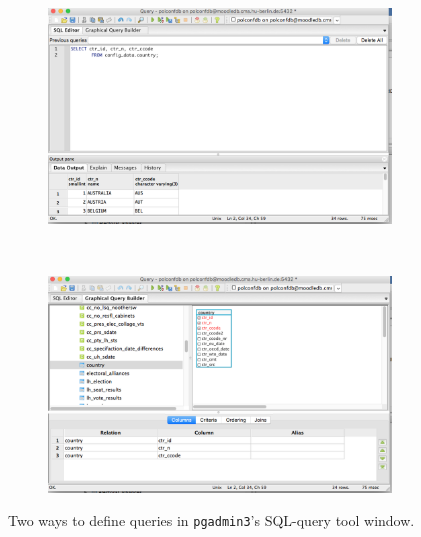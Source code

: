\begin{figure}[ht!]
\centering
  \begin{subfigure}{.45\textwidth}
  \includegraphics[width=\textwidth,trim= 0 0 0 0, clip]{pcdb_documentation_screenshots/pgadmin3_sql_query_tool_editor_country.png}
    \label{fig_pgadmin3_sql_query_tool_editor_country}
  \end{subfigure}
  ~%
  \begin{subfigure}{.45\textwidth}
  \includegraphics[width=\textwidth,trim= 0 0 0 0, clip]{pcdb_documentation_screenshots/pgadmin3_sql_query_tool_builder_country.png}
    \label{fig_pgadmin3_sql_query_tool_builder_country}
  \end{subfigure} 
  \caption{Two ways to define queries in \texttt{pgadmin3}'s SQL-query tool window.}
\end{figure}

